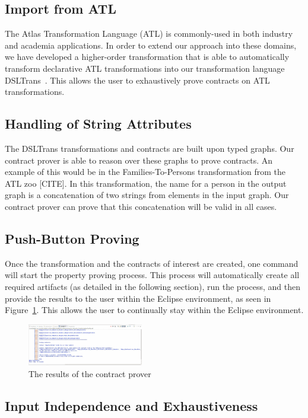 \subsection{Import from ATL}
The Atlas Transformation Language (ATL) is commonly-used in both industry and
academia applications. In order to extend our approach into these domains, we
have developed a higher-order transformation that is able to automatically
transform declarative ATL transformations into our transformation language
DSLTrans~\cite{Oakes}. This allows the user to exhaustively prove contracts on
ATL transformations.

\subsection{Handling of String Attributes}
The DSLTrans transformations and contracts are built upon typed graphs.
Our contract prover is able to reason over these graphs to prove contracts. An
example of this would be in the Families-To-Persons transformation from the ATL
zoo [CITE]. In this transformation, the name for a person in the output graph is
a concatenation of two strings from elements in the input graph. Our contract
prover can prove that this concatenation will be valid in all cases.

\subsection{Push-Button Proving}
Once the transformation and the contracts of interest are created, one command
will start the property proving process. This process will automatically create
all required artifacts (as detailed in the following section), run the process,
and then provide the results to the user within the Eclipse environment, as seen
in Figure~\ref{fig:output}. This allows the user to continually stay within the
Eclipse environment.

\begin{figure}
\centering
\includegraphics[width=0.45\textwidth]{figures/output}
\caption{The results of the contract prover}
\label{fig:output}
\end{figure}

\subsection{Input Independence and Exhaustiveness}

